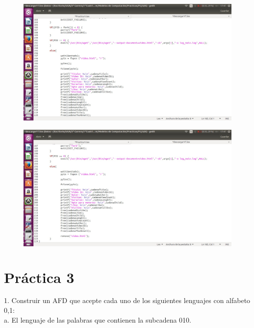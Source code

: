 \documentclass{article}
\begin{document}
\begin{figure}[!hp]
\includegraphics[width=\textwidth]{Captura de pantalla de 2018-01-07 17-47-43.jpg} 
\centering
\end{figure}

\begin{figure}[!hp]
\includegraphics[width=\textwidth]{Captura de pantalla de 2018-01-07 17-47-58.jpg} 
\centering
\end{figure}

\newpage
\section{Práctica 3}

\hspace{0,5cm} 1. Construir un AFD que acepte cada uno de los siguientes lenguajes con alfabeto {0,1}:\\

\hspace{1cm} a. El lenguaje de las palabras que contienen la subcadena 010.\\
\end{document}

